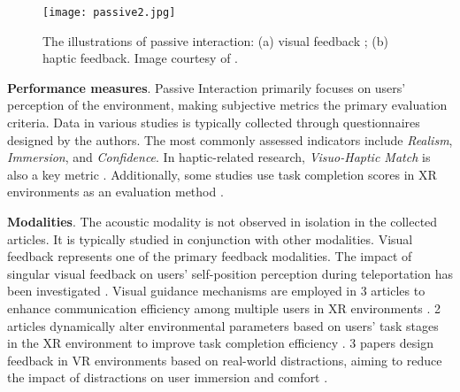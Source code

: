 \documentclass[review]{fcs}
\newcommand{\revise}[2]{\textcolor[rgb]{0,0,0}{#2}}
\begin{document}
\begin{figure}[t]
    \centering
    \texttt{[image: passive2.jpg]}
    \caption{\revise{}{The illustrations of passive interaction: (a) visual feedback \cite{DBLP:conf/chi/Pohlmann0MMB23}; (b) haptic feedback. Image courtesy of \cite{DBLP:conf/chi/Pohlmann0MMB23}}.}
    \label{img:passive}
\end{figure}

\textbf{Performance measures}.
Passive Interaction primarily focuses on users' perception of the environment, making subjective metrics the primary evaluation criteria. Data in various studies is typically collected through questionnaires designed by the authors. The most commonly assessed indicators include \textit{Realism}, \textit{Immersion}, and \textit{Confidence}. In haptic-related research, \textit{Visuo-Haptic Match} is also a key metric \cite{DBLP:conf/chi/ShenS022}. Additionally, some studies use task completion scores in XR environments as an evaluation method \cite{DBLP:conf/vr/LiLYTFX24,DBLP:conf/chi/Pohlmann0MMB23}.

\textbf{Modalities}.
The acoustic modality is not observed in isolation in the collected articles. It is typically studied in conjunction with other modalities. Visual feedback represents one of the primary feedback modalities. The impact of singular visual feedback on users' self-position perception during teleportation has been investigated \cite{DBLP:conf/chi/MedlarLG24}. Visual guidance mechanisms are employed in 3 articles to enhance communication efficiency among multiple users in XR environments \cite{10462901,DBLP:conf/vr/WangZF24,DBLP:conf/chi/RaschRS023}. 2 articles dynamically alter environmental parameters based on users' task stages in the XR environment to improve task completion efficiency \cite{DBLP:conf/chi/WuQQCRS24,DBLP:conf/vr/LiLYTFX24}. 
3 papers design feedback in VR environments based on real-world distractions, aiming to reduce the impact of distractions on user immersion and comfort \cite{DBLP:conf/chi/ElsharkawyAYAHK24,DBLP:conf/uist/Tao022,DBLP:conf/chi/Pohlmann0MMB23}.
\end{document}
